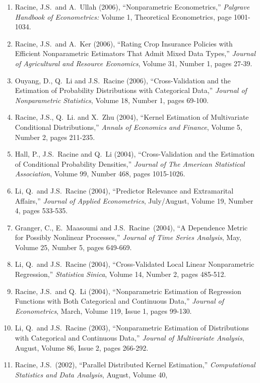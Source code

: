 \documentclass[
]{article}
\begin{document}
\begin{enumerate}
  133-141.
\item
  Racine, J.S.~and A.~Ullah (2006), ``Nonparametric Econometrics,''
  \emph{Palgrave Handbook of Econometrics:} Volume 1, Theoretical
  Econometrics, page 1001-1034.
\item
  Racine, J.S.~and A.~Ker (2006), ``Rating Crop Insurance Policies with
  Efficient Nonparametric Estimators That Admit Mixed Data Types,''
  \emph{Journal of Agricultural and Resource Economics}, Volume 31,
  Number 1, pages 27-39.
\item
  Ouyang, D., Q.~Li and J.S.~Racine (2006), ``Cross-Validation and the
  Estimation of Probability Distributions with Categorical Data,''
  \emph{Journal of Nonparametric Statistics}, Volume 18, Number 1, pages
  69-100.
\item
  Racine, J.S., Q.~Li. and X.~Zhu (2004), ``Kernel Estimation of
  Multivariate Conditional Distributions,'' \emph{Annals of Economics
  and Finance}, Volume 5, Number 2, pages 211-235.
\item
  Hall, P., J.S.~Racine and Q.~Li (2004), ``Cross-Validation and the
  Estimation of Conditional Probability Densities,'' \emph{Journal of
  The American Statistical Association}, Volume 99, Number 468, pages
  1015-1026.
\item
  Li, Q.~and J.S.~Racine (2004), ``Predictor Relevance and Extramarital
  Affairs,'' \emph{Journal of Applied Econometrics}, July/August, Volume
  19, Number 4, pages 533-535.
\item
  Granger, C., E.~Maasoumi and J.S.~Racine~(2004), ``A Dependence Metric
  for Possibly Nonlinear Processes,'' \emph{Journal of Time Series
  Analysis}, May, Volume 25, Number 5, pages 649-669.
\item
  Li, Q.~and J.S.~Racine (2004), ``Cross-Validated Local Linear
  Nonparametric Regression,'' \emph{Statistica Sinica}, Volume 14,
  Number 2, pages 485-512.
\item
  Racine, J.S.~and Q.~Li (2004), ``Nonparametric Estimation of
  Regression Functions with Both Categorical and Continuous Data,''
  \emph{Journal of Econometrics}, March, Volume 119, Issue 1, pages
  99-130.
\item
  Li, Q.~and J.S.~Racine (2003), ``Nonparametric Estimation of
  Distributions with Categorical and Continuous Data,'' \emph{Journal of
  Multivariate Analysis}, August, Volume 86, Issue 2, pages 266-292.
\item
  Racine, J.S.~(2002), ``Parallel Distributed Kernel Estimation,''
  \emph{Computational Statistics and Data Analysis}, August, Volume 40,

\end{enumerate}
\end{document}
